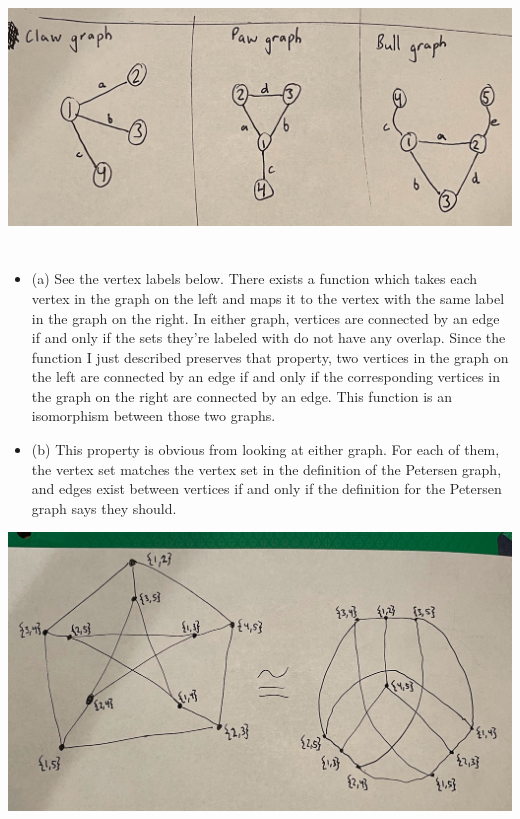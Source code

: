 \documentclass[12pt]{article}
\begin{document}
\includegraphics[width=\textwidth]{IMG_1384.jpg}

\section{}
\noindent{}\bigskip\par
\begin{itemize}
    \item (a) See the vertex labels below. There exists a function which takes each vertex in the graph on the left and maps it to the vertex with the same label in the graph on the right. In either graph, vertices are connected by an edge if and only if the sets they're labeled with do not have any overlap. Since the function I just described preserves that property, two vertices in the graph on the left are connected by an edge if and only if the corresponding vertices in the graph on the right are connected by an edge. This function is an isomorphism between those two graphs.
    \item (b) This property is obvious from looking at either graph. For each of them, the vertex set matches the vertex set in the definition of the Petersen graph, and edges exist between vertices if and only if the definition for the Petersen graph says they should.
\end{itemize}
\includegraphics[width=\textwidth]{IMG_1383.jpg}
\end{document}
